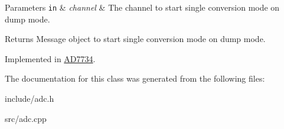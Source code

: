 \begin{DoxyParams}[1]{Parameters}
\mbox{\tt in}  & {\em channel} & The channel to start single conversion mode on dump mode. \\
\hline
\end{DoxyParams}
\begin{DoxyReturn}{Returns}
Message object to start single conversion mode on dump mode. 
\end{DoxyReturn}


Implemented in \mbox{\hyperlink{classAD7734_af677fbfbae0ec1c78b453ceb4a6736ec}{A\+D7734}}.



The documentation for this class was generated from the following files\+:\begin{DoxyCompactItemize}
\item 
include/adc.\+h\item 
src/adc.\+cpp\end{DoxyCompactItemize}
